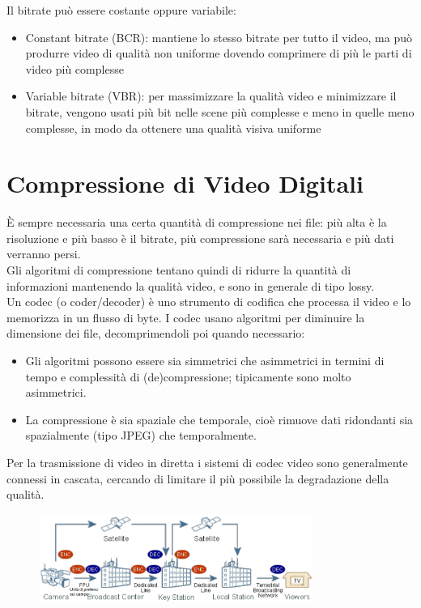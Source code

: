 \documentclass[a4paper,11pt]{article} %
\begin{document}
Il bitrate può essere costante oppure variabile: 
\begin{itemize}
\item Constant bitrate (BCR): mantiene lo stesso bitrate per tutto il video, ma può produrre video di qualità non uniforme dovendo comprimere di più le parti di video più complesse
\item Variable bitrate (VBR): per massimizzare la qualità video e minimizzare il bitrate, vengono usati più bit nelle scene più complesse e meno in quelle meno complesse, in modo da ottenere una qualità visiva uniforme
\end{itemize}

\section{Compressione di Video Digitali}
È sempre necessaria una certa quantità di compressione nei file: più alta è la risoluzione e più basso è il bitrate, più compressione sarà necessaria e più dati verranno persi.\\ 
Gli algoritmi di compressione tentano quindi di ridurre la quantità di informazioni mantenendo la qualità video, e sono in generale di tipo lossy.\\
Un codec (o coder/decoder) è uno strumento di codifica che processa il video e lo memorizza in un flusso di byte. I codec usano algoritmi per diminuire la dimensione dei file, decomprimendoli poi quando necessario:
\begin{itemize}
\item Gli algoritmi possono essere sia simmetrici che asimmetrici in termini di tempo e complessità di (de)compressione; tipicamente sono molto asimmetrici.
\item La compressione è sia spaziale che temporale, cioè rimuove dati ridondanti sia spazialmente (tipo JPEG) che temporalmente.
\end{itemize}
Per la trasmissione di video in diretta i sistemi di codec video sono generalmente connessi in cascata, cercando di limitare il più possibile la degradazione della qualità. 
\begin{figure} [h]
\centering
\includegraphics[width=0.8\textwidth]{Compression cascading}
\end{figure}
\end{document}
